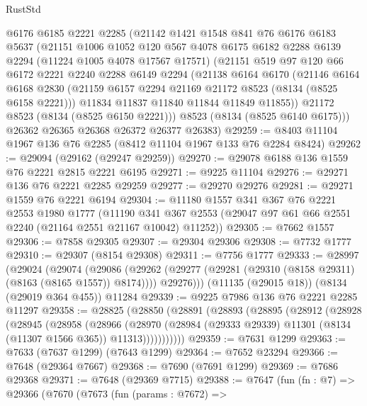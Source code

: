 \begin{lexlean}{RustStd}
\begin{coremodule}
    @6176
    @6185
    @2221
    @2285
    (@21142
      @1421
      @1548
      @841
      @76
      @6176
      @6183
      @5637
      (@21151
        @1006
        @1052
        @120
        @567
        @4078
        @6175
        @6182
        @2288
        @6139
        @2294
        (@11224 @1005 @4078 @17567 @17571)
        (@21151
          @519
          @97
          @120
          @66
          @6172
          @2221
          @2240
          @2288
          @6149
          @2294
          (@21138
            @6164
            @6170
            (@21146
              @6164
              @6168
              @2830
              (@21159 @6157 @2294 @21169 @21172 @8523 (@8134 (@8525 @6158 @2221)))
              @11834
              @11837
              @11840
              @11844
              @11849
              @11855))
          @21172
          @8523
          (@8134 (@8525 @6150 @2221)))
        @8523
        (@8134 (@8525 @6140 @6175)))
      @26362
      @26365
      @26368
      @26372
      @26377
      @26383)
@29259 := @8403 @11104 @1967 @136 @76 @2285 (@8412 @11104 @1967 @133 @76 @2284 @8424)
@29262 := @29094 (@29162 (@29247 @29259))
@29270 := @29078 @6188 @136 @1559 @76 @2221 @2815 @2221 @6195
@29271 := @9225 @11104
@29276 := @29271 @136 @76 @2221 @2285 @29259
@29277 := @29270 @29276
@29281 := @29271 @1559 @76 @2221 @6194
@29304 := @11180
    @1557
    @341
    @367
    @76
    @2221
    @2553
    @1980
    @1777
    (@11190 @341 @367 @2553 (@29047 @97 @61 @66 @2551 @2240 (@21164 @2551 @21167 @10042) @11252))
@29305 := @7662 @1557
@29306 := @7858 @29305
@29307 := @29304 @29306
@29308 := @7732 @1777
@29310 := @29307 (@8154 @29308)
@29311 := @7756 @1777
@29333 := @28997
    (@29024
      (@29074
        (@29086
          (@29262 (@29277 (@29281 (@29310 (@8158 @29311) (@8163 (@8165 @1557)) @8174))))
          @29276)))
    (@11135 (@29015 @18))
    (@8134 (@29019 @364 @455))
    @11284
@29339 := @9225 @7986 @136 @76 @2221 @2285 @11297
@29358 := @28825
    (@28850
      (@28891
        (@28893
          (@28895
            (@28912
              (@28928
                (@28945
                  (@28958
                    (@28966
                      (@28970
                        (@28984 (@29333 @29339) @11301 (@8134 (@11307 @1566 @365)) @11313)))))))))))
@29359 := @7631 @1299
@29363 := @7633 (@7637 @1299) (@7643 @1299)
@29364 := @7652 @23294
@29366 := @7648 (@29364 @7667)
@29368 := @7690 (@7691 @1299)
@29369 := @7686 @29368
@29371 := @7648 (@29369 @7715)
@29388 := @7647
    (fun (fn : @7) =>
    @29366
      (@7670
        (@7673
          (fun (params : @7672) =>

\end{coremodule}
\end{lexlean}
